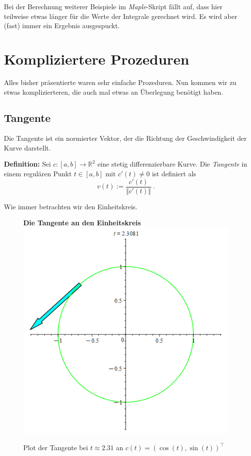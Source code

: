 \documentclass[12pt]{article}
\newcommand{\dabs}[1]{\ensuremath{\left\Vert#1\right\Vert}}
\newenvironment{Kasten}{\begin{mdframed}[linewidth=1pt]}{\end{mdframed}}
\newenvironment{Fig}{\begin{figure}[H]
\begin{center}}{\end{center}\end{figure}}
\begin{document}
Bei der Berechnung weiterer Beispiele im \textit{Maple}-Skript fällt auf, dass hier teilweise etwas länger für die Werte der Integrale gerechnet wird. Es wird aber (fast) immer ein Ergebnis ausgespuckt.

\section{Kompliziertere Prozeduren}
Alles bisher präsentierte waren sehr einfache Prozeduren. Nun kommen wir zu etwas komplizierteren, die auch mal etwas an Überlegung benötigt haben.
\subsection{Tangente}
Die Tangente ist ein normierter Vektor, der die Richtung der Geschwindigkeit der Kurve darstellt.
\begin{Kasten}
\textbf{Definition:} Sei $c: [a,b] \rightarrow \mathbb{R}^2$ eine stetig differenzierbare Kurve. Die \textit{Tangente} in einem regulären Punkt $t \in [a,b]$ mit $c'(t) \neq 0$ ist definiert als
\[v(t) := \frac{c'(t)}{\dabs{c'(t)}}~.\]
\end{Kasten}

Wie immer betrachten wir den Einheitskreis.
\begin{Fig}
\textbf{Die Tangente an den Einheitskreis}\\
\includegraphics[scale=0.25]{Einheitskreis_Tangente.png}
\caption{Plot der Tangente bei $t \approx 2.31$ an $c(t) = \left(\cos(t), \sin(t)\right)^\top$}
\label{fig:Die Tangente an den Einheitskreis}
\end{Fig}
\end{document}
